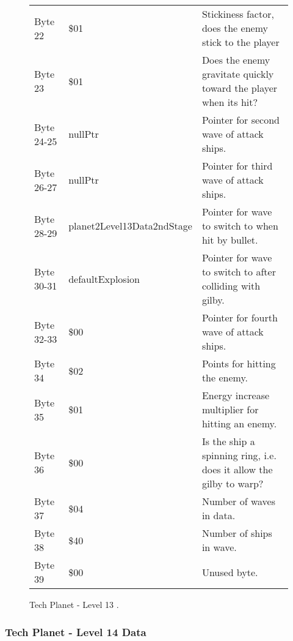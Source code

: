 \begin{figure}[H]
{\begin{adjustbox}{width=12cm}
\begin{tabular}{lll}
 Byte 22    & \$01                        & Stickiness factor, does the enemy stick to the player               \\
 Byte 23    & \$01                        & Does the enemy gravitate quickly toward the player when its hit?    \\
 Byte 24-25 & nullPtr                    & Pointer for second wave of attack ships.                            \\
 Byte 26-27 & nullPtr                    & Pointer for third wave of attack ships.                             \\
 Byte 28-29 & planet2Level13Data2ndStage & Pointer for wave to switch to when hit by bullet.                   \\
 Byte 30-31 & defaultExplosion           & Pointer for  wave to switch to after colliding with gilby.          \\
 Byte 32-33 & \$00                        & Pointer for fourth wave of attack ships.                            \\
 Byte 34    & \$02                        & Points for hitting the enemy.                                       \\
 Byte 35    & \$01                        & Energy increase multiplier for hitting an enemy.                    \\
 Byte 36    & \$00                        & Is the ship a spinning ring, i.e. does it allow the gilby to warp?  \\
 Byte 37    & \$04                        & Number of waves in data.                                            \\
 Byte 38    & \$40                        & Number of ships in wave.                                            \\
 Byte 39    & \$00                        & Unused byte.                                                        \\
\bottomrule
\end{tabular}

  \end{adjustbox}

  }\caption*{Tech Planet - Level 13
.}
\end{figure}

\clearpage
\subsubsection{Tech Planet - Level 14 Data}

